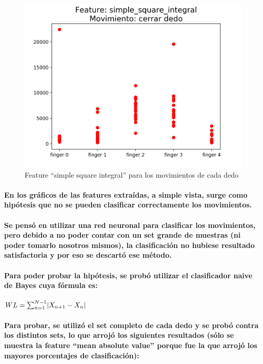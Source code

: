 \documentclass{article}
\DeclarePairedDelimiter\abs{\lvert}{\rvert}%
\begin{document}
\begin{figure}[ht]
    \centering
    \includegraphics[width=\textwidth]{Figure_3.png}%
    \caption{Feature “simple square integral” para los movimientos de cada dedo}
    \label{fig:feature3}
\end{figure}

\paragraph{
En los gráficos de las features extraídas, a simple vista, surge como hipótesis que no se pueden clasificar correctamente los movimientos.
}
\paragraph{
Se pensó en utilizar una red neuronal para clasificar los movimientos, pero debido a no poder contar con un set grande de muestras (ni poder tomarlo nosotros mismos), la clasificación no hubiese resultado satisfactoria y por eso se descartó ese método.
}
\paragraph{
Para poder probar la hipótesis, se probó utilizar el clasificador naive de Bayes cuya fórmula es:
}

\begin{center}
$WL = \sum_{n=1}^{N-1} \abs{X_{n + 1} - X_n}$
\end{center}

\paragraph{
Para probar, se utilizó el set completo de cada dedo y se probó contra los distintos sets, lo que arrojó los siguientes resultados (sólo se muestra la feature “mean absolute value” porque fue la que arrojó los mayores porcentajes de clasificación):
}
\end{document}
